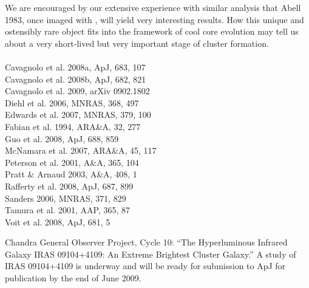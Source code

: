 \documentclass[letterpaper,11pt,twocolumn]{article}
\begin{document}
We are encouraged by our extensive experience with similar analysis
that Abell 1983, once imaged with \chandra, will yield very
interesting results. How this unique and ostensibly rare object fits
into the framework of cool core evolution may tell us about a very
short-lived but very important stage of cluster formation.\\

\\
Cavagnolo et al. 2008a, ApJ, 683, 107\\
Cavagnolo et al. 2008b, ApJ, 682, 821\\
Cavagnolo et al. 2009, arXiv 0902.1802\\
Diehl et al. 2006, MNRAS, 368, 497\\
Edwards et al. 2007, MNRAS, 379, 100\\
Fabian et al. 1994, ARA\&A, 32, 277\\
Guo et al. 2008, ApJ, 688, 859\\
McNamara et al. 2007, ARA\&A, 45, 117\\
Peterson et al. 2001, A\&A, 365, 104\\
Pratt \& Arnaud 2003, A\&A, 408, 1\\
Rafferty et al. 2008, ApJ, 687, 899\\
Sanders 2006, MNRAS, 371, 829\\
Tamura et al. 2001, AAP, 365, 87\\
Voit et al. 2008, ApJ, 681, 5

\onecolumn
{}

Chandra General Observer Project, Cycle 10: ``The Hyperluminous
Infrared Galaxy IRAS 09104+4109: An Extreme Brightest Cluster
Galaxy.'' A study of IRAS 09104+4109 is underway and will be ready for
submission to ApJ for publication by the end of June 2009.
\end{document}
